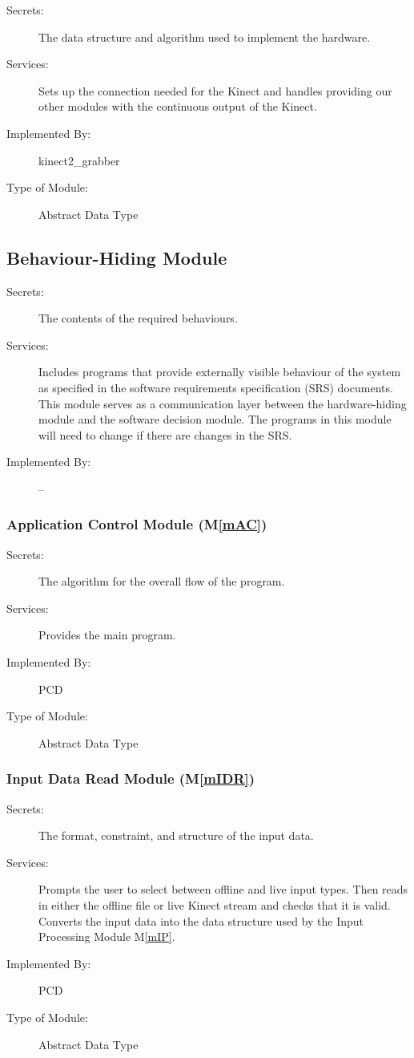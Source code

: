 \documentclass[12pt, titlepage]{article}
\newcommand{\mref}[1]{M\ref{#1}}
\begin{document}
\begin{description}
\item[Secrets:]The data structure and algorithm used to implement the hardware.
\item[Services:]Sets up the connection needed for the Kinect and handles providing
  our other modules with the continuous output of the Kinect.
\item[Implemented By:] kinect2\_grabber
\item[Type of Module:] Abstract Data Type
\end{description}

\subsection{Behaviour-Hiding Module}

\begin{description}
\item[Secrets:]The contents of the required behaviours.
\item[Services:]Includes programs that provide externally visible behaviour of
  the system as specified in the software requirements specification (SRS)
  documents. This module serves as a communication layer between the
  hardware-hiding module and the software decision module. The programs in this
  module will need to change if there are changes in the SRS.
\item[Implemented By:] --
\end{description}

\subsubsection{Application Control Module (\mref{mAC})}

\begin{description}
\item[Secrets:]The algorithm for the overall flow of the program.
\item[Services:]Provides the main program.
\item[Implemented By:]PCD
\item[Type of Module:]Abstract Data Type
\end{description}

\subsubsection{Input Data Read Module (\mref{mIDR})}

\begin{description}
\item[Secrets:]The format, constraint, and structure of the input data.
\item[Services:]Prompts the user to select between offline and live input types. Then reads 
  in either the offline file or live Kinect stream and checks that it is valid.
  Converts the input data into the data structure used by the Input Processing Module \mref{mIP}.
\item[Implemented By:]PCD
\item[Type of Module:]Abstract Data Type
\end{description}
\end{document}
